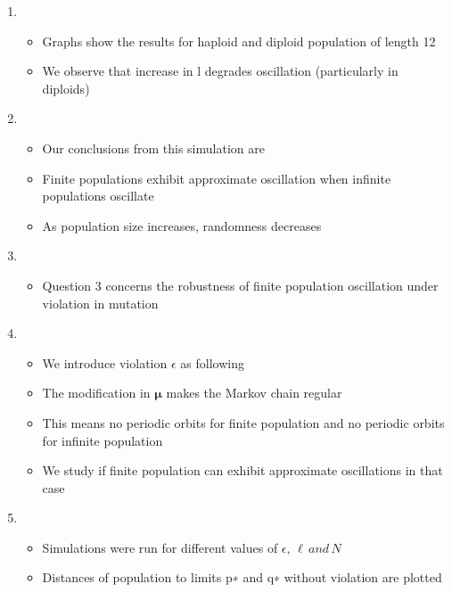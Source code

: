 \documentclass{article}
\begin{document}
\begin{enumerate}
\item
  \begin{itemize}
  \item Graphs show the results for haploid and diploid population of
    length 12
   \item We observe that increase in l degrades oscillation (particularly in diploids)
  \end{itemize}
    
\item
  \begin{itemize}
  \item Our conclusions from this simulation are
   \item Finite populations exhibit approximate oscillation when
     infinite populations oscillate
  \item As population size increases, randomness decreases  
  \end{itemize}
  
\item
  \begin{itemize}
  \item Question 3 concerns the robustness of finite population oscillation under violation in mutation
  
  \end{itemize}

\item
  \begin{itemize}
  \item We introduce violation $\epsilon$ as following
  \item The modification in $\bm{\mu}$ makes the Markov chain regular
  \item This means no periodic orbits for finite population and no periodic orbits for infinite population
  \item We study if finite population can exhibit approximate oscillations in that case 
  \end{itemize}
  
\item
  \begin{itemize}
  \item Simulations were run for different values of $\epsilon,\, \ell \,and\, N$
  \item Distances of population to limits p∗ and q∗ without violation are plotted  
  \end{itemize}
  

\end{enumerate}
\end{document}
